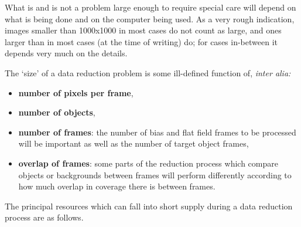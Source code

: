 \documentclass[twoside,11pt]{starlink}
\begin{document}
What is and is not a problem large enough to require special care
will depend on what is being done and on
the computer being used.
As a very rough indication, images smaller than 1000x1000
in most cases do not
count as large, and ones larger than
in most cases (at the time of writing) do;
for cases in-between it depends very much on the details.

The `size' of a data reduction problem is some ill-defined
function of, \textit{inter alia:}

\begin{itemize}

  \item \textbf{number of pixels per frame},

  \item \textbf{number of objects},

  \item \textbf{number of frames}:
   the number of bias and flat field frames to be processed will be important
   as well as the number of target object frames,

  \item \textbf{overlap of frames}:
   some parts of the reduction process which compare objects or
   backgrounds between frames will perform differently according
   to how much overlap in coverage there is between frames.

\end{itemize}

The principal resources which can fall into short supply during
a data reduction process are as follows.
\end{document}
